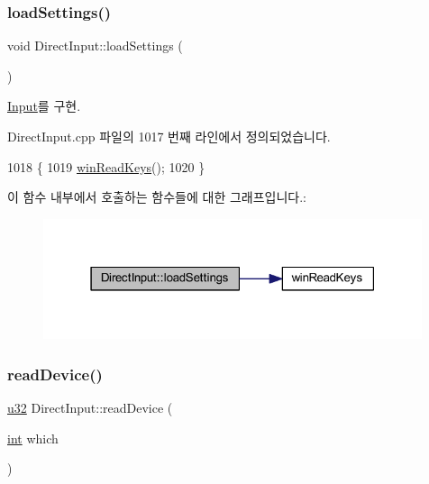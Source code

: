 \subsubsection{\texorpdfstring{load\+Settings()}{loadSettings()}}
{\footnotesize\ttfamily void Direct\+Input\+::load\+Settings (\begin{DoxyParamCaption}{ }\end{DoxyParamCaption})\hspace{0.3cm}{\ttfamily [virtual]}}



\mbox{\hyperlink{class_input_a098708c062b906c84ab036c04d447a29}{Input}}를 구현.



Direct\+Input.\+cpp 파일의 1017 번째 라인에서 정의되었습니다.


\begin{DoxyCode}
1018 \{
1019     \mbox{\hyperlink{_direct_input_8cpp_a9545d7069e105eaad4d4df360b398846}{winReadKeys}}();
1020 \}
\end{DoxyCode}
이 함수 내부에서 호출하는 함수들에 대한 그래프입니다.\+:
\nopagebreak
\begin{figure}[H]
\begin{center}
\leavevmode
\includegraphics[width=315pt]{class_direct_input_a4b63243a3581158956baf495a0dee51e_cgraph}
\end{center}
\end{figure}
\mbox{\label{class_direct_input_af7d74c03d302905eaa06e88ab37b7dac}} 
\subsubsection{\texorpdfstring{read\+Device()}{readDevice()}}
{\footnotesize\ttfamily \mbox{\hyperlink{_system_8h_a10e94b422ef0c20dcdec20d31a1f5049}{u32}} Direct\+Input\+::read\+Device (\begin{DoxyParamCaption}\item[{\mbox{\hyperlink{_util_8cpp_a0ef32aa8672df19503a49fab2d0c8071}{int}}}]{which }\end{DoxyParamCaption})\hspace{0.3cm}{\ttfamily [virtual]}}




